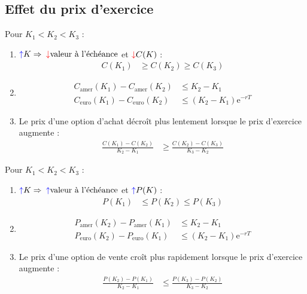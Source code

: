\documentclass[10pt, french]{article}
\begin{document}
\begin{multicols*}{2}
\columnbreak
\subsection{Effet du prix d'exercice}
\begin{definitionNOHFILLsub}
Pour $K_{1}	<	K_{2}	<	K_{3}$ :
\begin{enumerate}
	\item	${\color{blue}\uparrow} K \Rightarrow$ ${\color{red}\downarrow} \text{valeur à l'échéance}$ et ${\color{red}\downarrow} C(K)$ :
			\begin{align*}
			C(K_{1})	&\geq	C(K_{2}) \geq	C(K_{3})
			\end{align*}
	\item	\begin{align*}
			C_{\text{amer}}(K_{1}) - C_{\text{amer}}(K_{2}) &\leq K_{2} - K_{1}	\\
			C_{\text{euro}}(K_{1}) - C_{\text{euro}}(K_{2}) &\leq (K_{2} - K_{1})\textrm{e}^{-rT}
			\end{align*}
	\item	Le prix d'une option d'achat décroît plus lentement lorsque le prix d'exercice augmente :
			\begin{align*}
			\frac{C(K_{1}) - C(K_{2})}{K_{2} - K_{1}}
			&\geq	
			\frac{C(K_{2}) - C(K_{3})}{K_{3} - K_{2}}	
			\end{align*}
\end{enumerate}
\end{definitionNOHFILLsub}

\begin{definitionNOHFILLsub}
Pour $K_{1}	<	K_{2}	<	K_{3}$ :
\begin{enumerate}
	\item	${\color{blue}\uparrow} K \Rightarrow$ ${\color{blue}\uparrow} \text{valeur à l'échéance}$ et ${\color{blue}\uparrow} P(K)$ :
			\begin{align*}
			P(K_{1})	&\leq	P(K_{2}) \leq	P(K_{3})
			\end{align*}
	\item	\begin{align*}
			P_{\text{amer}}(K_{2}) - P_{\text{amer}}(K_{1}) &\leq K_{2} - K_{1}	\\
			P_{\text{euro}}(K_{2}) - P_{\text{euro}}(K_{1}) &\leq (K_{2} - K_{1})\textrm{e}^{-rT}
			\end{align*}
	\item	Le prix d'une option de vente croît plus rapidement lorsque le prix d'exercice augmente :
			\begin{align*}
			\frac{P(K_{2}) - P(K_{1})}{K_{2} - K_{1}}
			&\leq
			\frac{P(K_{3}) - P(K_{2})}{K_{3} - K_{2}}	
			\end{align*}
\end{enumerate}
\end{definitionNOHFILLsub}


\end{multicols*}
\end{document}
